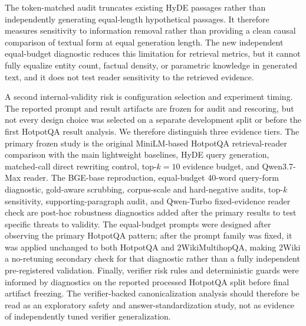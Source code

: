 The token-matched audit truncates existing HyDE passages rather than independently generating equal-length hypothetical passages. It therefore measures sensitivity to information removal rather than providing a clean causal comparison of textual form at equal generation length. The new independent equal-budget diagnostic reduces this limitation for retrieval metrics, but it cannot fully equalize entity count, factual density, or parametric knowledge in generated text, and it does not test reader sensitivity to the retrieved evidence.

A second internal-validity risk is configuration selection and experiment timing. The reported prompt and result artifacts are frozen for audit and rescoring, but not every design choice was selected on a separate development split or before the first HotpotQA result analysis. We therefore distinguish three evidence tiers. The primary frozen study is the original MiniLM-based HotpotQA retrieval-reader comparison with the main lightweight baselines, HyDE query generation, matched-call direct rewriting control, top-$k=10$ evidence budget, and Qwen3.7-Max reader. The BGE-base reproduction, equal-budget 40-word query-form diagnostic, gold-aware scrubbing, corpus-scale and hard-negative audits, top-$k$ sensitivity, supporting-paragraph audit, and Qwen-Turbo fixed-evidence reader check are post-hoc robustness diagnostics added after the primary results to test specific threats to validity. The equal-budget prompts were designed after observing the primary HotpotQA pattern; after the prompt family was fixed, it was applied unchanged to both HotpotQA and 2WikiMultihopQA, making 2Wiki a no-retuning secondary check for that diagnostic rather than a fully independent pre-registered validation. Finally, verifier risk rules and deterministic guards were informed by diagnostics on the reported processed HotpotQA split before final artifact freezing. The verifier-backed canonicalization analysis should therefore be read as an exploratory safety and answer-standardization study, not as evidence of independently tuned verifier generalization.

